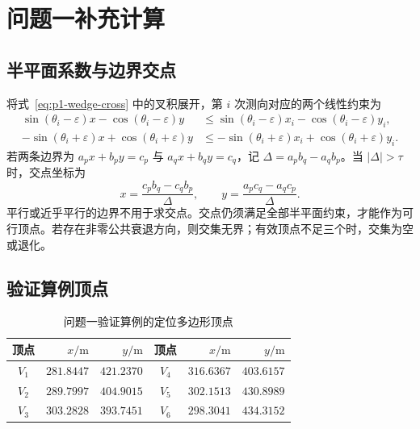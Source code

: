 \appendix
\section{问题一补充计算}
\label{app:p1-computation}

\subsection{半平面系数与边界交点}

将式~\eqref{eq:p1-wedge-cross} 中的叉积展开，第 \(i\) 次测向对应的两个线性约束为
\begin{equation}
  \begin{aligned}
  \sin(\theta_i-\varepsilon)x-\cos(\theta_i-\varepsilon)y
  &\le \sin(\theta_i-\varepsilon)x_i-\cos(\theta_i-\varepsilon)y_i,\\
  -\sin(\theta_i+\varepsilon)x+\cos(\theta_i+\varepsilon)y
  &\le -\sin(\theta_i+\varepsilon)x_i+\cos(\theta_i+\varepsilon)y_i.
  \end{aligned}
\end{equation}
若两条边界为 \(a_px+b_py=c_p\) 与 \(a_qx+b_qy=c_q\)，记 \(\Delta=a_pb_q-a_qb_p\)。当 \(|\Delta|>\tau\) 时，交点坐标为
\begin{equation}
  x=\frac{c_pb_q-c_qb_p}{\Delta},\qquad
  y=\frac{a_pc_q-a_qc_p}{\Delta}.
\end{equation}
平行或近乎平行的边界不用于求交点。交点仍须满足全部半平面约束，才能作为可行顶点。若存在非零公共衰退方向，则交集无界；有效顶点不足三个时，交集为空或退化。

\subsection{验证算例顶点}

\begin{table}[H]
  \centering
  \caption{问题一验证算例的定位多边形顶点}
  \label{tab:p1-vertices}
  \begin{tabular}{crr@{\qquad}crr}
    \toprule
    顶点 & \(x/\mathrm{m}\) & \(y/\mathrm{m}\) &
    顶点 & \(x/\mathrm{m}\) & \(y/\mathrm{m}\) \\
    \midrule
    \(V_1\) & \(281.8447\) & \(421.2370\) &
    \(V_4\) & \(316.6367\) & \(403.6157\) \\
    \(V_2\) & \(289.7997\) & \(404.9015\) &
    \(V_5\) & \(302.1513\) & \(430.8989\) \\
    \(V_3\) & \(303.2828\) & \(393.7451\) &
    \(V_6\) & \(298.3041\) & \(434.3152\) \\
    \bottomrule
  \end{tabular}
\end{table}

